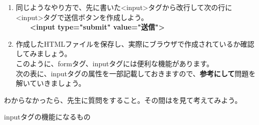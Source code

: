 \documentclass[text06.tex]{subfiles}
\begin{document}
\begin{enumerate}
  \item
    同じようなやり方で、先に書いた{\textless}input{\textgreater}タグから改行して次の行に{\textless}input{\textgreater}タグで送信ボタンを作成しよう。\\
    \ \ \ \ \textbf{{\textless}input type="submit" value="送信"{\textgreater}}

  \item
    作成したHTMLファイルを保存し、実際にブラウザで作成されているか確認してみましょう。\\
    このように、formタグ、inputタグには便利な機能があります。\\
    次の表に、inputタグの属性を一部記載しておきますので、\textbf{参考にして}問題を解いていきましょう。
\end{enumerate}

\clearpage

\begin{tcolorbox}[title=\useOmetoi,breakable]\label{Q:HTML}
  \begin{enumerate}
  \end{enumerate}
\end{tcolorbox}

\clearpage



わからなかったら、先生に質問をすること。その間はを見て考えてみよう。

inputタグの機能になるもの
\end{document}
